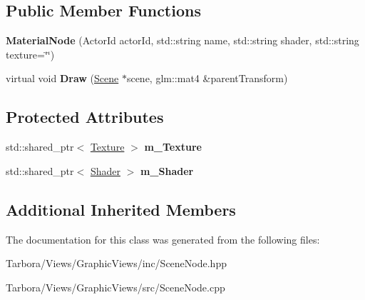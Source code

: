 \subsection*{Public Member Functions}
\begin{DoxyCompactItemize}
\item 
\mbox{\label{classTarbora_1_1MaterialNode_afd0e3139cbb0826d6036dd6d67b59b99}} 
{\bfseries Material\+Node} (Actor\+Id actor\+Id, std\+::string name, std\+::string shader, std\+::string texture=\char`\"{}\char`\"{})
\item 
\mbox{\label{classTarbora_1_1MaterialNode_ab8f6e0d14b183da53bd08af20dc45193}} 
virtual void {\bfseries Draw} (\hyperlink{classTarbora_1_1Scene}{Scene} $\ast$scene, glm\+::mat4 \&parent\+Transform)
\end{DoxyCompactItemize}
\subsection*{Protected Attributes}
\begin{DoxyCompactItemize}
\item 
\mbox{\label{classTarbora_1_1MaterialNode_a74acc208d1b85cedc9f88f14a1cc87db}} 
std\+::shared\+\_\+ptr$<$ \hyperlink{classTarbora_1_1Texture}{Texture} $>$ {\bfseries m\+\_\+\+Texture}
\item 
\mbox{\label{classTarbora_1_1MaterialNode_ac974ea545195c373b5d59abf2605629c}} 
std\+::shared\+\_\+ptr$<$ \hyperlink{classTarbora_1_1Shader}{Shader} $>$ {\bfseries m\+\_\+\+Shader}
\end{DoxyCompactItemize}
\subsection*{Additional Inherited Members}


The documentation for this class was generated from the following files\+:\begin{DoxyCompactItemize}
\item 
Tarbora/\+Views/\+Graphic\+Views/inc/Scene\+Node.\+hpp\item 
Tarbora/\+Views/\+Graphic\+Views/src/Scene\+Node.\+cpp\end{DoxyCompactItemize}
